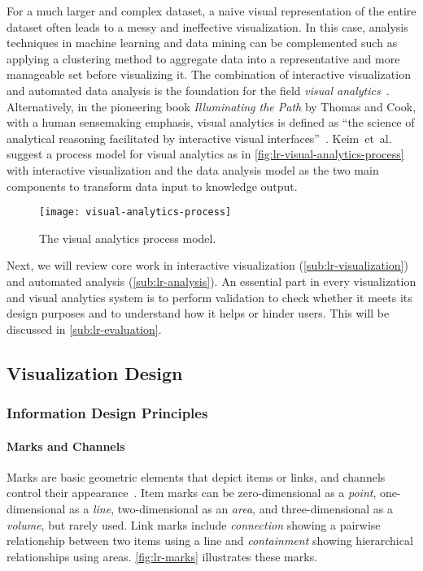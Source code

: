 For a much larger and complex dataset, a naive visual representation of the entire dataset often leads to a messy and ineffective visualization. In this case, analysis techniques in machine learning and data mining can be complemented such as applying a clustering method to aggregate data into a representative and more manageable set before visualizing it. The combination of interactive visualization and automated data analysis is the foundation for the field \emph{visual analytics}~\cite{Keim2008}. Alternatively, in the pioneering book \emph{Illuminating the Path} by Thomas and Cook, with a human sensemaking emphasis, visual analytics is defined as ``the science of analytical reasoning facilitated by interactive visual interfaces''~\cite{Thomas2005}. Keim~et~al.~\cite{Keim2010} suggest a process model for visual analytics as in \autoref{fig:lr-visual-analytics-process} with interactive visualization and the data analysis model as the two main components to transform data input to knowledge output. 

\begin{figure}[!htb]
	\centering
	\texttt{[image: visual-analytics-process]}
	\caption{The visual analytics process model. }
	\label{fig:lr-visual-analytics-process}
\end{figure}

Next, we will review core work in interactive visualization (\autoref{sub:lr-visualization}) and automated analysis (\autoref{sub:lr-analysis}). An essential part in every visualization and visual analytics system is to perform validation to check whether it meets its design purposes and  to understand how it helps or hinder users. This will be discussed in \autoref{sub:lr-evaluation}.

\subsection{Visualization Design}
\label{sub:lr-visualization}

\subsubsection{Information Design Principles}
\label{sub:lr-design}

\paragraph{Marks and Channels}
Marks are basic geometric elements that depict items or links, and channels control their appearance~\cite{Munzner2014}. Item marks can be zero-dimensional as a \emph{point}, one-dimensional as a \emph{line}, two-dimensional as an \emph{area}, and three-dimensional as a \emph{volume}, but rarely used. Link marks include \emph{connection} showing a pairwise relationship between two items using a line and \emph{containment} showing hierarchical relationships using areas. \autoref{fig:lr-marks} illustrates these marks. 

